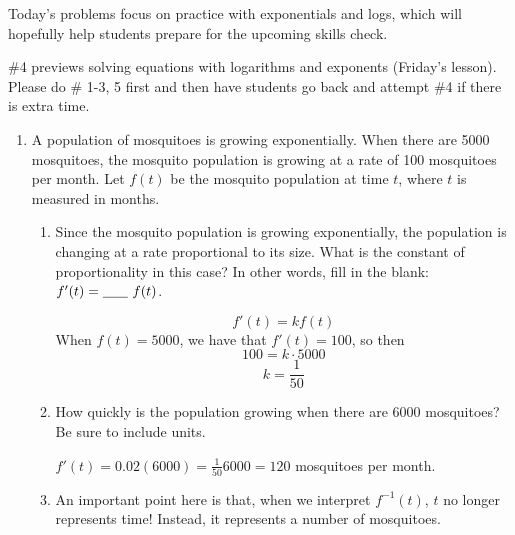 \documentclass{article}
\begin{document}

\begin{workshop}
  Today's problems focus on practice with exponentials and logs, which will hopefully help students prepare for the upcoming skills check.

  \#4 previews solving equations with logarithms and exponents (Friday's lesson). Please do \# 1-3, 5 first and then have students go back and attempt \#4 if there is extra time.
\end{workshop}

\begin{enumerate}
\item  A population of mosquitoes is growing exponentially.  When there are 5000 mosquitoes, the mosquito population is growing at a rate of 100 mosquitoes per month. Let $f(t)$ be the mosquito population at time $t$, where $t$ is measured in months. 

  \begin{enumerate}

  \item
    \begin{problem}[\vfill]
      Since the mosquito population is growing exponentially, the population is changing at a rate proportional to its size. What is the constant of proportionality in this case? In other words, fill in the blank: $f'(t) = \fitb{0.25in}{}\ f(t)$.
    \end{problem}

    \begin{solution} 
      $$f'(t) = kf(t)$$ 
      When $f(t)=5000$, we have that $f'(t) = 100$, so then
      $$100=k \cdot 5000 $$ 
      $$k = \frac{1}{50}$$  
    \end{solution} 

  \item
    \begin{problem}[\vfill]
      How quickly is the population growing when there are 6000 mosquitoes? Be sure to include units.
    \end{problem}

    \begin{solution}
      $f'(t)=0.02(6000)=\frac{1}{50}6000=120$ mosquitoes per month.
    \end{solution}

  \item %

    \begin{workshop}
      An important point here is that, when we interpret $f^{-1}(t)$, $t$ no longer represents time! Instead, it represents a number of mosquitoes. 
    \end{workshop}


\end{enumerate}
\end{enumerate}
\end{document}

